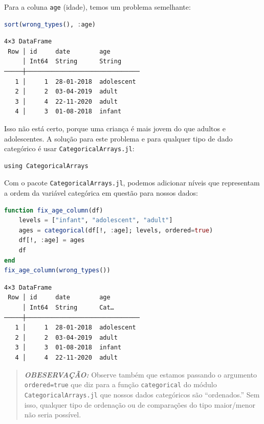 \documentclass[
  notoc %
]{tufte-book}
\newcommand{\passthrough}[1]{#1}
\begin{document}
Para a coluna \passthrough{\lstinline!age!} (idade), temos um problema
semelhante:

\begin{lstlisting}[language=Julia]
sort(wrong_types(), :age)
\end{lstlisting}

\begin{lstlisting}[language=Output]
4×3 DataFrame
 Row │ id     date        age
     │ Int64  String      String
─────┼───────────────────────────────
   1 │     1  28-01-2018  adolescent
   2 │     2  03-04-2019  adult
   3 │     4  22-11-2020  adult
   4 │     3  01-08-2018  infant
\end{lstlisting}

Isso não está certo, porque uma criança é mais jovem do que adultos e
adolescentes. A solução para este problema e para qualquer tipo de dado
categórico é usar \passthrough{\lstinline!CategoricalArrays.jl!}:

\begin{lstlisting}
using CategoricalArrays
\end{lstlisting}

Com o pacote \passthrough{\lstinline!CategoricalArrays.jl!}, podemos
adicionar níveis que representam a ordem da variável categórica em
questão para nossos dados:

\begin{lstlisting}[language=Julia]
function fix_age_column(df)
    levels = ["infant", "adolescent", "adult"]
    ages = categorical(df[!, :age]; levels, ordered=true)
    df[!, :age] = ages
    df
end
fix_age_column(wrong_types())
\end{lstlisting}

\begin{lstlisting}[language=Output]
4×3 DataFrame
 Row │ id     date        age
     │ Int64  String      Cat…
─────┼───────────────────────────────
   1 │     1  28-01-2018  adolescent
   2 │     2  03-04-2019  adult
   3 │     3  01-08-2018  infant
   4 │     4  22-11-2020  adult
\end{lstlisting}

\begin{quote}
\textbf{\emph{OBESERVAÇÃO:}} Observe também que estamos passando o
argumento \passthrough{\lstinline!ordered=true!} que diz para a função
\passthrough{\lstinline!categorical!} do módulo
\passthrough{\lstinline!CategoricalArrays.jl!} que nossos dados
categóricos são ``ordenados.'' Sem isso, qualquer tipo de ordenação ou
de comparações do tipo maior/menor não seria possível.
\end{quote}
\end{document}
